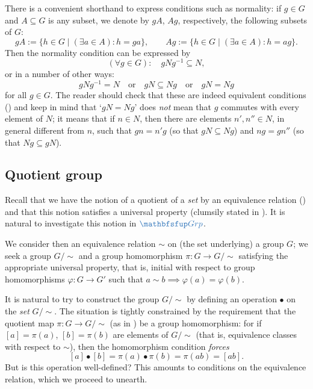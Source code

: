 There is a convenient shorthand to express conditions such as
normality: if $g \in G$ and $A \subseteq G$ is any subset, we denote
by $gA$, $Ag$, respectively, the following subsets of $G$:
\[
  gA := \{h \in G \mid (\exists a \in A) : h = ga\}, \qquad Ag := \{h
  \in G \mid (\exists a \in A) : h = ag\}.
\]
Then the normality condition can be expressed by
\[
  (\forall g \in G) : \quad gNg^{-1} \subseteq N,
\]
or in a number of other ways:
\[
  gNg^{-1} = N \quad \text{or} \quad gN \subseteq Ng \quad \text{or}
  \quad gN = Ng
\]
for all $g \in G$. The reader should check that these are indeed
equivalent conditions
() and keep in mind
that `$gN = Ng$' does \emph{not} mean that $g$ commutes with every
element of $N$; it means that if $n \in N$, then there are elements
$n', n'' \in N$, in general different from $n$, such that $gn = n'g$
(so that $gN \subseteq Ng$) and $ng = gn''$ (so that
$Ng \subseteq gN$).

\subsection{Quotient group}
\label{subsec:groups:quotient-group}
Recall that we have the notion of a quotient of a \emph{set} by an
equivalence relation () and
that this notion satisfies a universal property (clumsily stated in
). It is natural to investigate this
notion in $\categ{Grp}$.

We consider then an equivalence relation $\sim$ on (the set
underlying) a group $G$; we seek a group $G/\!\sim$ and a group
homomorphism $\pi : G \to G/\!\sim$ satisfying the appropriate
universal property, that is, initial with respect to group
homomorphisms $\varphi : G \to G'$ such that
$a \sim b \implies \varphi(a) = \varphi(b)$.

It is natural to try to construct the group $G/\!\sim$ by defining an
operation $\bullet$ on the \emph{set} $G/\!\sim$. The situation is
tightly constrained by the requirement that the quotient map
$\pi : G \to G/\!\sim$ (as in
) be
a group homomorphism: for if $[a] = \pi(a)$, $[b] = \pi(b)$ are
elements of $G/\!\sim$ (that is, equivalence classes with respect to
$\sim$), then the homomorphism condition \emph{forces}
\[ [a] \bullet [b] = \pi(a) \bullet \pi(b) = \pi(ab) = [ab].
\]
But is this operation well-defined? This amounts to conditions on the
equivalence relation, which we proceed to unearth.

